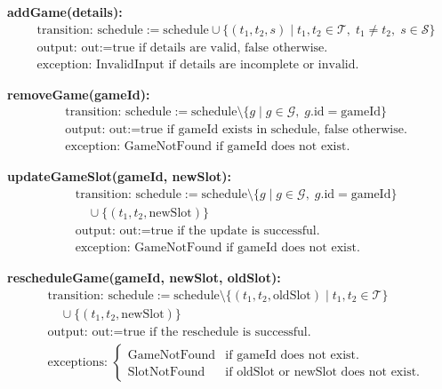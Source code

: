 \documentclass[12pt, titlepage]{article}
\begin{document}
\vspace{1em}

\noindent \textbf{addGame(details):}
\begin{align*}
    & \text{transition: } \text{schedule} := \text{schedule} \cup \{(t_1, t_2, s) \;|\; t_1, t_2 \in \mathcal{T}, \; t_1 \neq t_2, \; s \in \mathcal{S}\} \\
    & \text{output: } \text{out} := \text{true if details are valid, false otherwise.} \\
    & \text{exception: } \text{InvalidInput if details are incomplete or invalid.}
\end{align*}

\vspace{1em}

\noindent \textbf{removeGame(gameId):}
\begin{align*}
    & \text{transition: } \text{schedule} := \text{schedule} \setminus \{g \;|\; g \in \mathcal{G}, \; g.\text{id} = \text{gameId}\} \\
    & \text{output: } \text{out} := \text{true if gameId exists in schedule, false otherwise.} \\
    & \text{exception: } \text{GameNotFound if gameId does not exist.}
\end{align*}

\vspace{1em}

\noindent \textbf{updateGameSlot(gameId, newSlot):}
\begin{align*}
    & \text{transition: } \text{schedule} := \text{schedule} \setminus \{g \;|\; g \in \mathcal{G}, \; g.\text{id} = \text{gameId}\} \\
    & \quad \cup \{(t_1, t_2, \text{newSlot})\} \\
    & \text{output: } \text{out} := \text{true if the update is successful.} \\
    & \text{exception: } \text{GameNotFound if gameId does not exist.}
\end{align*}

\vspace{1em}

\noindent \textbf{rescheduleGame(gameId, newSlot, oldSlot):}
\begin{align*}
    & \text{transition: } \text{schedule} := \text{schedule} \setminus \{(t_1, t_2, \text{oldSlot}) \;|\; t_1, t_2 \in \mathcal{T}\} \\
    & \quad \cup \{(t_1, t_2, \text{newSlot})\} \\
    & \text{output: } \text{out} := \text{true if the reschedule is successful.} \\
    & \text{exceptions: }
    \begin{cases}
        \text{GameNotFound} & \text{if gameId does not exist.} \\
        \text{SlotNotFound} & \text{if oldSlot or newSlot does not exist.}
    \end{cases}
\end{align*}
\end{document}
